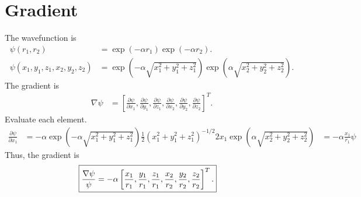\section{Gradient}
The wavefunction is 
\begin{align}
\psi(r_1, r_2) &= \exp(-\alpha r_1) \exp(-\alpha r_2). \\
\psi(x_1, y_1, z_1, x_2, y_2, z_2) &= \exp \left(-\alpha \sqrt{x_1^2 + y_1^2 + z_1^2}\right) \exp \left(\alpha \sqrt{x_2^2 + y_2^2 + z_2^2} \right).
\end{align}
The gradient is
\begin{align}
\nabla \psi &= \left[
\frac{\partial \psi}{\partial x_1}, 
\frac{\partial \psi}{\partial y_1}, 
\frac{\partial \psi}{\partial z_1},
\frac{\partial \psi}{\partial x_2},
\frac{\partial \psi}{\partial y_2},
\frac{\partial \psi}{\partial z_2}
\right]^T.
\end{align}
Evaluate each element.
\begin{align}
\frac{\partial \psi}{\partial x_1} &= -\alpha \exp \left(-\alpha \sqrt{x_1^2 + y_1^2 + z_1^2}\right) \frac{1}{2} (x_1^2 + y_1^2 + z_1^2)^{-1/2} 2x_1 \exp \left(\alpha \sqrt{x_2^2 + y_2^2 + z_2^2} \right)
&= -\alpha \frac{x_1}{r_1} \psi
\end{align}
Thus, the gradient is 
\begin{align}
\Aboxed{\frac{\nabla \psi}{\psi} &= -\alpha \left[\frac{x_1}{r_1}, \frac{y_1}{r_1}, \frac{z_1}{r_1}, \frac{x_2}{r_2}, \frac{y_2}{r_2}, \frac{z_2}{r_2} \right]^T.}
\end{align}


